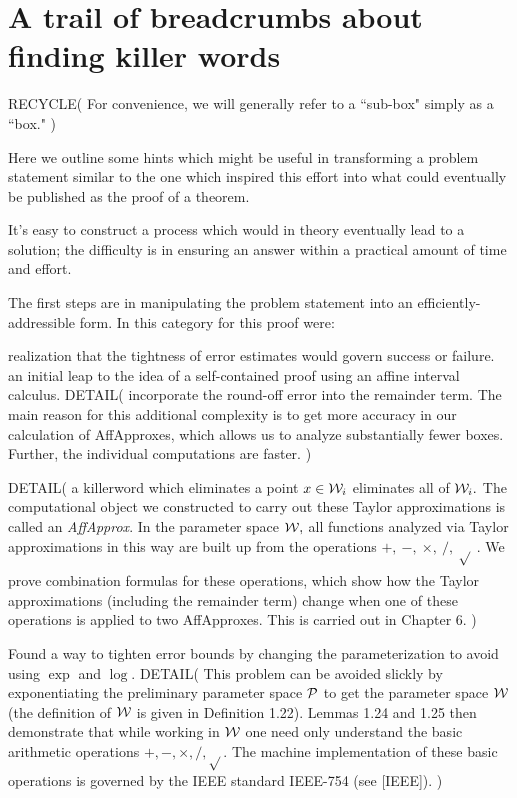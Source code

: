 \section{A trail of breadcrumbs about finding killer words}
RECYCLE(
For convenience, we will generally refer to a ``sub-box" simply as a ``box."
)

Here we outline some hints which might be useful
in transforming a problem statement similar to the one which inspired this effort
into what could eventually be published as the proof of a theorem.

It's easy to construct a process which would in theory eventually lead to a solution;
the difficulty is in ensuring an answer within a practical amount of time and effort.

The first steps are in manipulating the problem statement into an efficiently-addressible form.
In this category for this proof were:
\begin{itemize}
   realization that the tightness of error estimates would govern success or failure.
   an initial leap to the idea of a self-contained proof using an affine interval calculus.
DETAIL(
incorporate the round-off error into the remainder term.  
The main reason for this additional complexity is to get
more accuracy in our calculation of AffApproxes, 
which allows us to analyze substantially fewer boxes.
Further, the individual computations are faster.
)

DETAIL(
a killerword which eliminates a point $x\in {\cal W}_i$ eliminates all of ${\cal W}_i.$  
The computational object we constructed to carry out these Taylor approximations is called an {\it AffApprox}.
In the parameter space ${\cal W},$ all functions analyzed via Taylor
approximations in this way are built up from the
operations $ +,\ -,\ \times, \  /,\ \sqrt{}_{\phantom{|}} .$  We prove combination
formulas for these operations, which show how the Taylor approximations
(including the remainder term) change when one of these operations is
applied to two AffApproxes.   This is carried out in Chapter 6. 
)

   Found a way to tighten error bounds by changing the parameterization to avoid using $\exp$ and $\log$.
DETAIL(
This problem can be  avoided slickly by exponentiating the preliminary parameter space ${\cal P}$ to get the parameter space ${\cal W}$ (the
definition of ${\cal W}$ is given in Definition 1.22).   Lemmas 1.24 and 1.25 then demonstrate
that while working in ${\cal W}$ one need only
understand the basic arithmetic operations $+, -, \times, /, \sqrt{}$.
The machine implementation of these basic operations is governed by the IEEE standard IEEE-754 (see [IEEE]).
)
\end{itemize}

